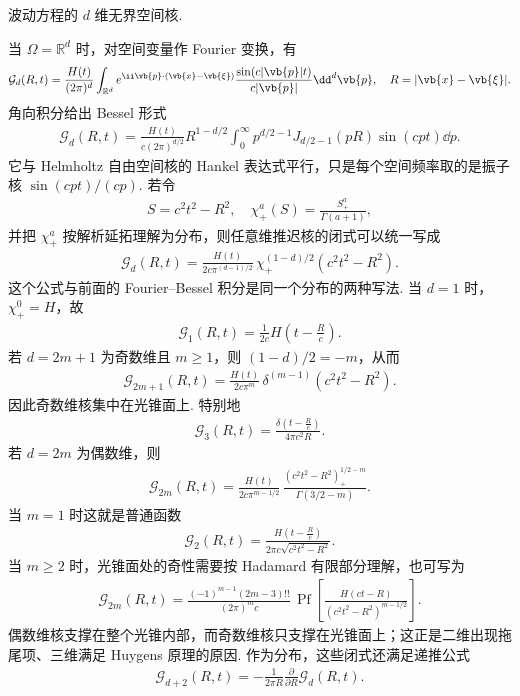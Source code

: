 \begin{exbox}
	波动方程的 \(d\) 维无界空间核.
	
	当 \(\Omega=\mathbb{R}^d\) 时，对空间变量作 Fourier 变换，有
	\begin{align*}
		\mathcal{G}_d(R,t)
		=\frac{H(t)}{(2\pi)^d}\int_{\mathbb{R}^d}
		e^{\ii\vb{p}\cdot(\vb{x}-\vb{\xi})}
		\frac{\sin(c|\vb{p}|t)}{c|\vb{p}|}\dd^d\vb{p},
		\quad R=|\vb{x}-\vb{\xi}|.
	\end{align*}
	角向积分给出 Bessel 形式
	\begin{align*}
		\mathcal{G}_d(R,t)
		=\frac{H(t)}{c(2\pi)^{d/2}}R^{1-d/2}
		\int_0^\infty p^{d/2-1}J_{d/2-1}(pR)\sin(cpt)\dd p.
	\end{align*}
	它与 Helmholtz 自由空间核的 Hankel 表达式平行，只是每个空间频率取的是振子核 \(\sin(cpt)/(cp)\). 若令
\begin{align*}
		S=c^2t^2-R^2,
		\quad
		\chi_+^a(S)=\frac{S_+^a}{\Gamma(a+1)},
\end{align*}
	并把 \(\chi_+^a\) 按解析延拓理解为分布，则任意维推迟核的闭式可以统一写成
\begin{align*}
		\mathcal{G}_d(R,t)
		=\frac{H(t)}{2c\pi^{(d-1)/2}}\,
		\chi_+^{(1-d)/2}\left(c^2t^2-R^2\right).
\end{align*}
	这个公式与前面的 Fourier--Bessel 积分是同一个分布的两种写法. 当 \(d=1\) 时，\(\chi_+^0=H\)，故
\begin{align*}
		\mathcal{G}_1(R,t)=\frac{1}{2c}H\left(t-\frac{R}{c}\right).
\end{align*}
	若 \(d=2m+1\) 为奇数维且 \(m\geq1\)，则 \((1-d)/2=-m\)，从而
\begin{align*}
		\mathcal{G}_{2m+1}(R,t)
		=\frac{H(t)}{2c\pi^m}\,
		\delta^{(m-1)}\left(c^2t^2-R^2\right).
\end{align*}
	因此奇数维核集中在光锥面上. 特别地
\begin{align*}
		\mathcal{G}_3(R,t)=\frac{\delta\left(t-\frac{R}{c}\right)}{4\pi c^2R}.
\end{align*}
	若 \(d=2m\) 为偶数维，则
\begin{align*}
		\mathcal{G}_{2m}(R,t)
		=\frac{H(t)}{2c\pi^{m-1/2}}\,
		\frac{\left(c^2t^2-R^2\right)_+^{1/2-m}}{\Gamma(3/2-m)}.
\end{align*}
	当 \(m=1\) 时这就是普通函数
\begin{align*}
		\mathcal{G}_2(R,t)=\frac{H\left(t-\frac{R}{c}\right)}{2\pi c\sqrt{c^2t^2-R^2}}.
\end{align*}
	当 \(m\geq2\) 时，光锥面处的奇性需要按 Hadamard 有限部分理解，也可写为
\begin{align*}
		\mathcal{G}_{2m}(R,t)
		=\frac{(-1)^{m-1}(2m-3)!!}{(2\pi)^m c}\,
		\operatorname{Pf}\left[
		\frac{H(ct-R)}{\left(c^2t^2-R^2\right)^{m-1/2}}
		\right].
\end{align*}
	偶数维核支撑在整个光锥内部，而奇数维核只支撑在光锥面上；这正是二维出现拖尾项、三维满足 Huygens 原理的原因. 作为分布，这些闭式还满足递推公式
\begin{align*}
		\mathcal{G}_{d+2}(R,t)=-\frac{1}{2\pi R}\frac{\partial}{\partial R}\mathcal{G}_d(R,t).
\end{align*}
\end{exbox}

